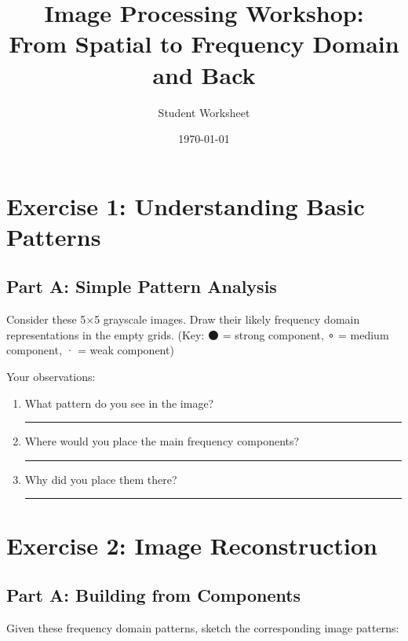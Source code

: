 \documentclass{article}
\begin{document}
\title{Image Processing Workshop:\\ From Spatial to Frequency Domain and Back}
\author{Student Worksheet}
\date{\today}
\maketitle

\section*{Exercise 1: Understanding Basic Patterns}

\subsection*{Part A: Simple Pattern Analysis}
Consider these 5$\times$5 grayscale images. Draw their likely frequency domain representations in the empty grids.
(Key: ⚫ = strong component, ∘ = medium component, · = weak component)

\begin{center}
\end{center}

Your observations:
\begin{enumerate}
\item What pattern do you see in the image? \rule{8cm}{0.15mm}
\item Where would you place the main frequency components? \rule{8cm}{0.15mm}
\item Why did you place them there? \rule{8cm}{0.15mm}
\end{enumerate}

\vspace{1cm}

\section*{Exercise 2: Image Reconstruction}

\subsection*{Part A: Building from Components}
Given these frequency domain patterns, sketch the corresponding image patterns:
\end{document}
